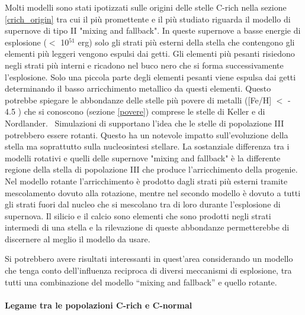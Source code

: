 \documentclass[12pt]{article}
\begin{document}
Molti modelli sono stati ipotizzati sulle origini delle stelle C-rich nella sezione \ref{crich_origin} tra cui il più promettente e il più studiato riguarda il modello di supernove di tipo II "mixing and fallback". In queste supernove a basse energie di esplosione ($<$ 10$^{51}$ erg) solo gli strati più esterni della stella che contengono gli elementi più leggeri vengono espulsi dai getti. Gli elementi più pesanti risiedono negli strati più interni e ricadono nel buco nero che si forma successivamente l’esplosione. Solo una piccola parte degli elementi pesanti viene espulsa dai getti determinando il basso arricchimento metallico da questi elementi. Questo potrebbe spiegare le abbondanze delle stelle più povere di metalli ([Fe/H] $<$ - 4.5 ) che si conoscono (sezione \ref{povere}) comprese le stelle di Keller e di Nordlander. 
\ Simulazioni di \cite{Stacy} supportano l’idea che le stelle di popolazione III potrebbero essere rotanti. Questo ha un notevole impatto sull’evoluzione della stella ma soprattutto sulla nucleosintesi stellare. La sostanziale differenza tra i modelli rotativi e quelli delle supernove "mixing and fallback" è la differente regione della stella di popolazione III che produce l’arricchimento della progenie. Nel modello rotante l’arricchimento è prodotto dagli strati più esterni tramite mescolamento dovuto alla rotazione, mentre nel secondo modello è dovuto a tutti gli strati fuori dal nucleo che si mescolano tra di loro durante l’esplosione di supernova. Il silicio e il calcio sono elementi che sono prodotti negli strati intermedi di una stella e la rilevazione di queste abbondanze permetterebbe di discernere al meglio il modello da usare. \

Si potrebbero avere risultati interessanti in quest’area considerando un modello che tenga conto dell’influenza reciproca di diversi meccanismi di esplosione, tra tutti una combinazione del modello “mixing and fallback” e quello rotante.

\paragraph{Legame tra le popolazioni C-rich e C-normal }
\end{document}
